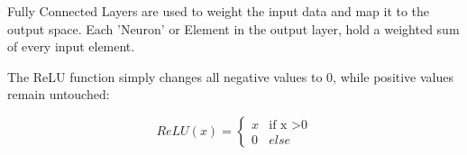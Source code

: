 Fully Connected Layers are used to weight the input data and map it to the output space. Each 'Neuron' or Element in the output layer, hold a weighted sum of every input element.

The ReLU function simply changes all negative values to 0, while positive values remain untouched:

\begin{equation}
ReLU (x) = 
\begin{cases}
x & \text{if x >0} \\
0 & else
\end{cases}
\end{equation}


\pagebreak